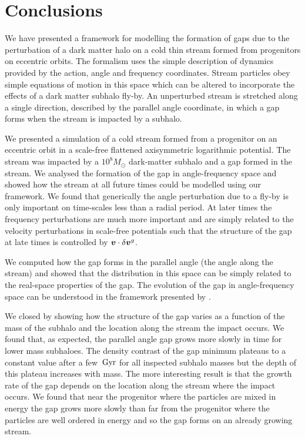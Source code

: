\documentclass[useAMS,usenatbib,fleqn,a4paper]{mn2e}
\def\Gyr{\,{\rm Gyr}}
\newcommand{\bs}[1]{\bmath{#1}}
\begin{document}
\section{Conclusions}\label{Sect::Conclusions}
We have presented a framework for modelling the formation of gaps due to the perturbation of a dark matter halo on a cold thin stream formed from progenitors on eccentric orbits. The formalism uses the simple description of dynamics provided by the action, angle and frequency coordinates. Stream particles obey simple equations of motion in this space which can be altered to incorporate the effects of a dark matter subhalo fly-by. An unperturbed stream is stretched along a single direction, described by the parallel angle coordinate, in which a gap forms when the stream is impacted by a subhalo.

We presented a simulation of a cold stream formed from a progenitor on an eccentric orbit in a scale-free flattened axisymmetric logarithmic potential. The stream was impacted by a $10^8M_\odot$ dark-matter subhalo and a gap formed in the stream. We analysed the formation of the gap in angle-frequency space and showed how the stream at all future times could be modelled using our framework. We found that generically the angle perturbation due to a fly-by is only important on time-scales less than a radial period. At later times the frequency perturbations are much more important and are simply related to the velocity perturbations in scale-free potentials such that the structure of the gap at late times is controlled by $\bs{v}\cdot\delta\bs{v}^g$.

We computed how the gap forms in the parallel angle (the angle along the stream) and showed that the distribution in this space can be simply related to the real-space properties of the gap. The evolution of the gap in angle-frequency space can be understood in the framework presented by \cite{ErkalBelokurov2015}.

We closed by showing how the structure of the gap varies as a function of the mass of the subhalo and the location along the stream the impact occurs. We found that, as expected, the parallel angle gap grows more slowly in time for lower mass subhaloes. The density contrast of the gap minimum plateaus to a constant value after a few $\Gyr$ for all inspected subhalo masses but the depth of this plateau increases with mass. The more interesting result is that the growth rate of the gap depends on the location along the stream where the impact occurs. We found that near the progenitor where the particles are mixed in energy the gap grows more slowly than far from the progenitor where the particles are well ordered in energy and so the gap forms on an already growing stream.
\end{document}
